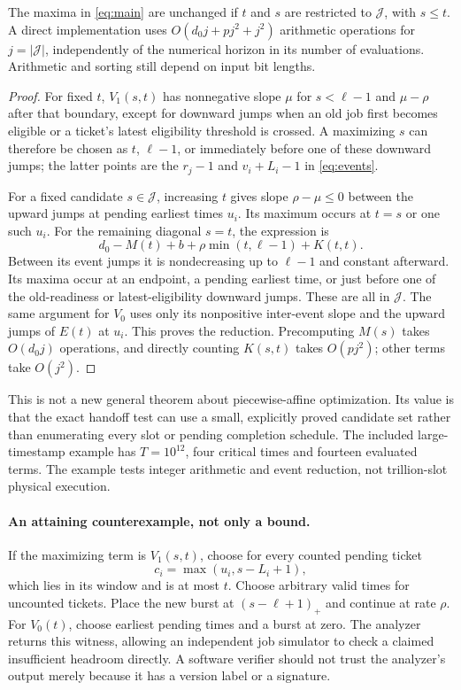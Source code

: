 \begin{theorem}
\label{thm:events}
The maxima in \cref{eq:main} are unchanged if $t$ and $s$ are restricted to $\mathcal J$, with $s\le t$. A direct implementation uses $O(d_0j+pj^2+j^2)$ arithmetic operations for $j=|\mathcal J|$, independently of the numerical horizon in its number of evaluations. Arithmetic and sorting still depend on input bit lengths.
\end{theorem}
\begin{proof}
For fixed $t$, $V_1(s,t)$ has nonnegative slope $\mu$ for $s<\ell-1$ and $\mu-\rho$ after that boundary, except for downward jumps when an old job first becomes eligible or a ticket's latest eligibility threshold is crossed. A maximizing $s$ can therefore be chosen as $t$, $\ell-1$, or immediately before one of these downward jumps; the latter points are the $r_j-1$ and $v_i+L_i-1$ in \cref{eq:events}.

For a fixed candidate $s\in\mathcal J$, increasing $t$ gives slope $\rho-\mu\le0$ between the upward jumps at pending earliest times $u_i$. Its maximum occurs at $t=s$ or one such $u_i$. For the remaining diagonal $s=t$, the expression is
\[
d_0-M(t)+b+\rho\min(t,\ell-1)+K(t,t).
\]
Between its event jumps it is nondecreasing up to $\ell-1$ and constant afterward. Its maxima occur at an endpoint, a pending earliest time, or just before one of the old-readiness or latest-eligibility downward jumps. These are all in $\mathcal J$. The same argument for $V_0$ uses only its nonpositive inter-event slope and the upward jumps of $E(t)$ at $u_i$. This proves the reduction. Precomputing $M(s)$ takes $O(d_0j)$ operations, and directly counting $K(s,t)$ takes $O(pj^2)$; other terms take $O(j^2)$.
\end{proof}
This is not a new general theorem about piecewise-affine optimization. Its value is that the exact handoff test can use a small, explicitly proved candidate set rather than enumerating every slot or pending completion schedule. The included large-timestamp example has $T=10^{12}$, four critical times and fourteen evaluated terms. The example tests integer arithmetic and event reduction, not trillion-slot physical execution.

\paragraph{An attaining counterexample, not only a bound.}
If the maximizing term is $V_1(s,t)$, choose for every counted pending ticket
\[
c_i=\max(u_i,s-L_i+1),
\]
which lies in its window and is at most $t$. Choose arbitrary valid times for uncounted tickets. Place the new burst at $(s-\ell+1)_+$ and continue at rate $\rho$. For $V_0(t)$, choose earliest pending times and a burst at zero. The analyzer returns this witness, allowing an independent job simulator to check a claimed insufficient headroom directly. A software verifier should not trust the analyzer's output merely because it has a version label or a signature.

